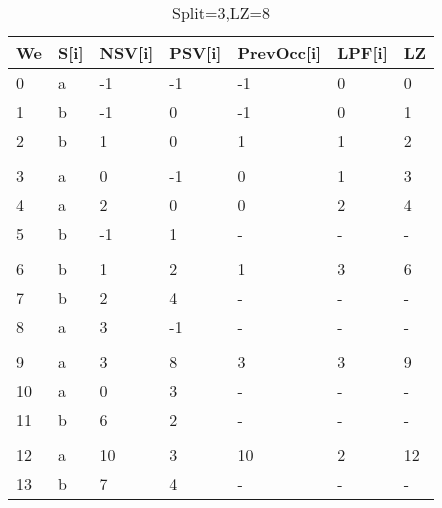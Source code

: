 \begin{table}[h]
\centering
\begin{tabular}{@{}lllllll@{}}
\toprule
We  & S{[}i{]} & NSV{[}i{]} & PSV{[}i{]} & PrevOcc{[}i{]} & LPF{[}i{]} & LZ \\ \midrule
0  & a        & -1         & -1         & -1             & 0          & 0  \\
1  & b        & -1         & 0          & -1             & 0          & 1  \\
2  & b        & 1          & 0          & 1              & 1          & 2  \\
   &          &            &            &                &            &    \\
3  & a        & 0          & -1         & 0              & 1          & 3  \\
4  & a        & 2          & 0          & 0              & 2          & 4  \\
5  & b        & -1         & 1          & -              & -          & -  \\
   &          &            &            &                &            &    \\
6  & b        & 1          & 2          & 1              & 3          & 6  \\
7  & b        & 2          & 4          & -              & -          & -  \\
8  & a        & 3          & -1         & -              & -          & -  \\
   &          &            &            &                &            &    \\
9  & a        & 3          & 8          & 3              & 3          & 9  \\
10 & a        & 0          & 3          & -              & -          & -  \\
11 & b        & 6          & 2          & -              & -          & -  \\
   &          &            &            &                &            &    \\
12 & a        & 10         & 3          & 10             & 2          & 12 \\
13 & b        & 7          & 4          & -              & -          & -  \\ \bottomrule
\end{tabular}
\caption{Split=3,LZ=8}
\label{table:example3}
\end{table}

